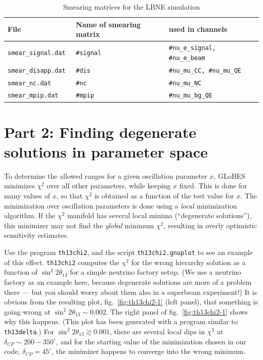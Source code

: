 \documentclass[12pt,a4paper]{article}
\newcommand{\sthchooz}{\ensuremath{\sin^2 2\theta_{13}}}
\theoremstyle{dotless}
\begin{document}
\begin{table}
  \centering
  \begin{tabular}{llp{6.5cm}}
    \hline
    File                  & Name of smearing matrix & used in channels \\ \hline
    \tt smear\_signal.dat & \tt \#signal            & \tt \#nu\_e\_signal,
                                                          \#nu\_e\_beam \\
    \tt smear\_disapp.dat & \tt \#dis               & \tt \#nu\_mu\_CC,
                                                          \#nu\_mu\_QE \\
    \tt smear\_nc.dat     & \tt \#nc                & \tt \#nu\_mu\_NC \\
    \tt smear\_mpip.dat   & \tt \#mpip              & \tt \#nu\_mu\_bg\_QE \\
    \hline
  \end{tabular}
  \caption{Smearing matrices for the LBNE simulation}
  \label{tab:smearing}
\end{table}


\section*{Part 2: Finding degenerate solutions in parameter space}

To determine the allowed ranges for a given oscillation parameter $x$, GLoBES
minimizes $\chi^2$ over all other parameters, while keeping $x$ fixed. This is
done for many values of $x$, so that $\chi^2$ is obtained as a function of the
test value for $x$.  The minimization over oscillation parameters is done using
a \emph{local} minimization algorithm. If the $\chi^2$ manifold has several
local minima (``degenerate solutions''), this minimizer may not find the
\emph{global} minimum $\chi^2$, resulting in overly optimistic sensitivity
estimates.

Use the program {\tt th13chi2}, and the script {\tt th13chi2.gnuplot} to see
an example of this effect. {\tt th13chi2} computes the $\chi^2$ for the wrong
hierarchy solution as a function of $\sin^2 2\theta_{13}$ for a simple neutrino
factory setup. (We use a neutrino factory as an example here, because degenerate
solutions are more of a problem there --- but you should worry about them also
in a superbeam experiment!) It is obvious from the resulting plot,
fig.~\ref{fig:th13chi2-1} (left panel), that something is going wrong at $\sthchooz \sim
0.002$. The right panel of fig.~\ref{fig:th13chi2-1} shows why this happens.
(This plot has been generated with a program similar to {\tt th13delta}.) For
$\sthchooz \gtrsim 0.001$, there are several local dips in $\chi^2$ at
$\delta_{CP} \sim 200-350^\circ$, and for the starting value of the minimization
chosen in our code, $\delta_{CP} = 45^\circ$, the minimizer happens to converge
into the wrong minimum.
\end{document}
